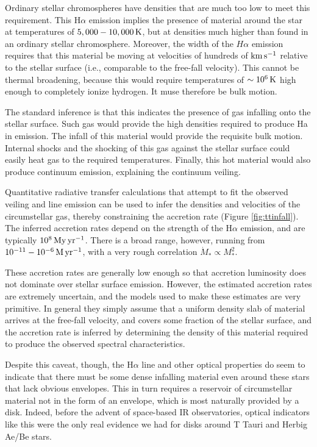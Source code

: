 \documentclass[a4paper,10pt]{article}
\begin{document}
{\noindent}Ordinary stellar chromospheres have densities that are much too low to meet this requirement. This H$\alpha$ emission implies the presence of material around the star at temperatures of $5,000-10,000\,{\rm K}$, but at densities much higher than found in an ordinary stellar chromosphere. Moreover, the width of the $H\alpha$ emission requires that this material be moving at velocities of hundreds of ${\rm km\,s^{-1}}$ relative to the stellar surface (i.e., comparable to the free-fall velocity). This cannot be thermal broadening, because this would require temperatures of $\sim10^6\,{\rm K}$ high enough to completely ionize hydrogen. It muse therefore be bulk motion.

{\noindent}The standard inference is that this indicates the presence of gas infalling onto the stellar surface. Such gas would provide the high densities required to produce Ha in emission. The infall of this material would provide the requisite bulk motion. Internal shocks and the shocking of this gas against the stellar surface could easily heat gas to the required temperatures. Finally, this hot material would also produce continuum emission, explaining the continuum veiling.

{\noindent}Quantitative radiative transfer calculations that attempt to fit the observed veiling and line emission can be used to infer the densities and velocities of the circumstellar gas, thereby constraining the accretion rate (Figure \ref{fig:ttinfall}). The inferred accretion rates depend on the strength of the H$\alpha$ emission, and are typically $10^8\,{\rm My\,yr^{-1}}$. There is a broad range, however, running from $10^{-11}-10^{-6}\,{\rm M\,yr^{-1}}$, with a very rough correlation $\dot{M}_*\propto M_*^2$.

{\noindent}These accretion rates are generally low enough so that accretion luminosity does not dominate over stellar surface emission. However, the estimated accretion rates are extremely uncertain, and the models used to make these estimates are very primitive. In general they simply assume that a uniform density slab of material arrives at the free-fall velocity, and covers some fraction of the stellar surface, and the accretion rate is inferred by determining the density of this material required to produce the observed spectral characteristics.

{\noindent}Despite this caveat, though, the H$\alpha$ line and other optical properties do seem to indicate that there must be some dense infalling material even around these stars that lack obvious envelopes. This in turn requires a reservoir of circumstellar material not in the form of an envelope, which is most naturally provided by a disk. Indeed, before the advent of space-based IR observatories, optical indicators like this were the only real evidence we had for disks around T Tauri and Herbig Ae/Be stars.
\end{document}
